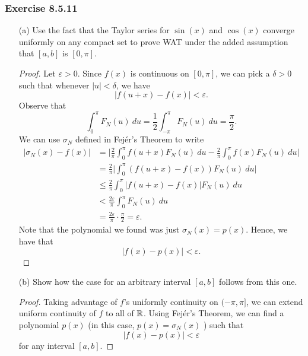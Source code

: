 \subsubsection{Exercise 8.5.11}
\begin{enumerate}
    \item[(a)] Use the fact that the Taylor series for \( \sin(x)  \) and \( \cos(x) \) converge uniformly on any compact set to prove WAT under the added assumption that \( [a,b] \) is \( [0, \pi] \).
        \begin{proof}
            Let \( \varepsilon > 0  \). Since \( f(x)  \) is continuous on \( [0, \pi] \), we can pick a \( \delta > 0 \) such that whenever \( | u | < \delta  \), we have
            \[  | f(u+x) - f(x)  | < \varepsilon. \] 
            Observe that 
            \[ \int_{ 0 }^{ \pi } F_{N}(u)   \ du = \frac{ 1 }{ 2 } \int_{ - \pi  }^{ \pi  } F_{N}(u)  \ du = \frac{ \pi }{ 2 }. \]
            We can use \( \sigma_{N} \) defined in Fej\'{e}r's  Theorem to write
            \begin{align*}
                | \sigma_{N}(x) - f(x)  | &= \Big| \frac{ 2 }{ \pi  } \int_{ 0 }^{ \pi  } f(u+x) F_{N}(u)   \ du - \frac{ 2 }{ \pi  } \int_{ 0  }^{ \pi  } f(x) F_{N}(u)  \ du  \Big|  \\
                                          &= \frac{ 2 }{ \pi  } \Big| \int_{ 0 }^{ \pi  } (f(u+x)-f(x)) F_{N}(u) \ du \Big| \\
                                          &\leq \frac{ 2  }{ \pi  } \int_{ 0 }^{ \pi  } | f(u+x) - f(x) | F_{N}(u) \ du \\
                                          &< \frac{ 2 \varepsilon  }{ \pi  } \int_{ 0 }^{ \pi  } F_{N}(u) \ du \\
                                          &= \frac{ 2 \varepsilon }{ \pi  } \cdot \frac{ \pi }{ 2 } = \varepsilon.
            \end{align*}
        Note that the polynomial we found was just \( \sigma _{N}(x)  = p(x) \). Hence, we have that 
        \[  | f(x) - p(x) | < \varepsilon. \]
        \end{proof}
    \item[(b)] Show how the case for an arbitrary interval \( [a,b] \) follows from this one.
        \begin{proof}
            Taking advantage of \( f  \)'s uniformly continuity on \( ( -\pi ,\pi ] \), we can extend uniform continuity of \( f  \) to all of \( \mathbb{R}  \). Using  Fej\'{e}r's Theorem, we can find a polynomial \( p(x) \) (in this case, \( p(x) = \sigma_{N}(x) \) ) such that 
            \[  | f(x) - p(x) | < \varepsilon \]for any interval \( [a,b] \).  
        \end{proof}
\end{enumerate}




